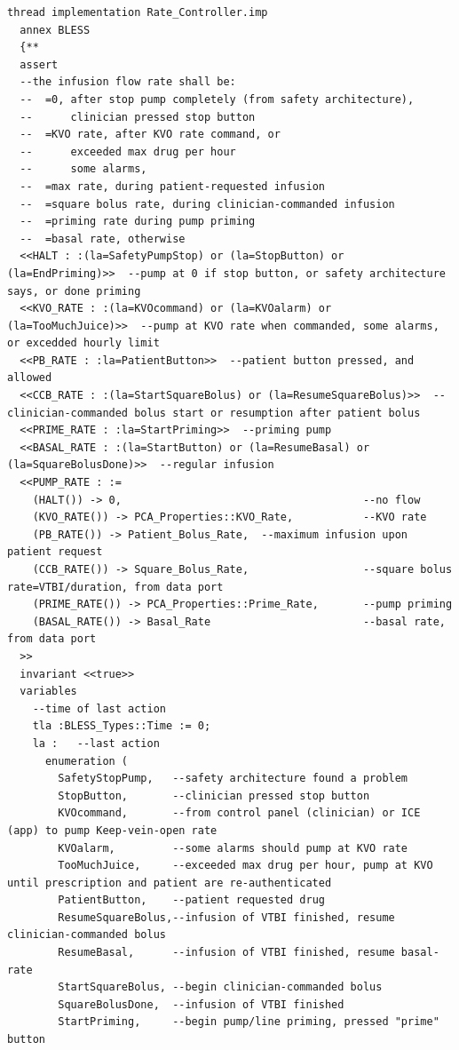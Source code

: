 \begin{lstlisting}[language=aadl, frame=single, gobble=0, caption={\lstinline{Rate_Controller} thread from \lstinline{PCA_Operation} component with BLESS assertions}]
  thread implementation Rate_Controller.imp
  annex BLESS
  {**
  assert
  --the infusion flow rate shall be:
  --  =0, after stop pump completely (from safety architecture), 
  --      clinician pressed stop button
  --  =KVO rate, after KVO rate command, or
  --      exceeded max drug per hour
  --      some alarms,
  --  =max rate, during patient-requested infusion
  --  =square bolus rate, during clinician-commanded infusion 
  --  =priming rate during pump priming
  --  =basal rate, otherwise
  <<HALT : :(la=SafetyPumpStop) or (la=StopButton) or (la=EndPriming)>>  --pump at 0 if stop button, or safety architecture says, or done priming
  <<KVO_RATE : :(la=KVOcommand) or (la=KVOalarm) or (la=TooMuchJuice)>>  --pump at KVO rate when commanded, some alarms, or excedded hourly limit
  <<PB_RATE : :la=PatientButton>>  --patient button pressed, and allowed
  <<CCB_RATE : :(la=StartSquareBolus) or (la=ResumeSquareBolus)>>  --clinician-commanded bolus start or resumption after patient bolus
  <<PRIME_RATE : :la=StartPriming>>  --priming pump
  <<BASAL_RATE : :(la=StartButton) or (la=ResumeBasal) or (la=SquareBolusDone)>>  --regular infusion
  <<PUMP_RATE : :=
    (HALT()) -> 0,                                      --no flow
    (KVO_RATE()) -> PCA_Properties::KVO_Rate,           --KVO rate
    (PB_RATE()) -> Patient_Bolus_Rate,  --maximum infusion upon patient request
    (CCB_RATE()) -> Square_Bolus_Rate,                  --square bolus rate=VTBI/duration, from data port
    (PRIME_RATE()) -> PCA_Properties::Prime_Rate,       --pump priming
    (BASAL_RATE()) -> Basal_Rate                        --basal rate, from data port
  >>
  invariant <<true>>
  variables
    --time of last action
    tla :BLESS_Types::Time := 0;
    la :   --last action
      enumeration ( 
        SafetyStopPump,   --safety architecture found a problem
        StopButton,       --clinician pressed stop button
        KVOcommand,       --from control panel (clinician) or ICE (app) to pump Keep-vein-open rate
        KVOalarm,         --some alarms should pump at KVO rate
        TooMuchJuice,     --exceeded max drug per hour, pump at KVO until prescription and patient are re-authenticated
        PatientButton,    --patient requested drug
        ResumeSquareBolus,--infusion of VTBI finished, resume clinician-commanded bolus
        ResumeBasal,      --infusion of VTBI finished, resume basal-rate
        StartSquareBolus, --begin clinician-commanded bolus
        SquareBolusDone,  --infusion of VTBI finished
        StartPriming,     --begin pump/line priming, pressed "prime" button

\end{lstlisting}
